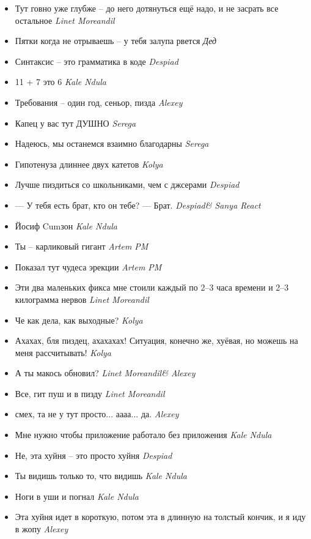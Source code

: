 \documentclass[11pt]{book}
\newcommand{\entry}[2] {\large{\textmd{#1}} \textemdash \small{\emph{#2}}}
\newcommand{\kn}{Kale Ndula}
\newcommand{\lm}{Linet Moreandil}
\newcommand{\dd}{Despiad}
\newcommand{\al}{Alexey}
\newcommand{\se}{Serega}
\newcommand{\nb}{Kolya}
\begin{document}
\begin{itemize}[leftmargin=0cm]
\item \entry{Тут говно уже глубже -- до него дотянуться ещё надо, и не засрать все остальное}{\lm}
\item \entry{Пятки когда не отрываешь -- у тебя залупа рвется}{Дед}
\item \entry{Синтаксис -- это грамматика в коде}{\dd}
\item \entry{11 + 7 это 6}{\kn}
\item \entry{Требования -- один год, сеньор, пизда}{\al}
\item \entry{Капец у вас тут ДУШНО}{\se}
\item \entry{Надеюсь, мы останемся взаимно благодарны}{\se}
\item \entry{Гипотенуза длиннее двух катетов}{\nb}
\item \entry{Лучше пиздиться со школьниками, чем с джсерами}{\dd}
\item \entry{--- У тебя есть брат, кто он тебе? --- Брат.}{\dd \& Sanya React}
\item \entry{Йосиф Cumзон}{\kn}
\item \entry{Ты -- карликовый гигант}{Artem PM}
\item \entry{Показал тут чудеса эрекции}{Artem PM}
\item \entry{Эти два маленьких фикса мне стоили каждый по 2--3 часа времени и 2--3 килограмма нервов}{\lm}
\item \entry{Че как дела, как выходные?}{\nb}
\item \entry{Ахахах, бля пиздец, ахахахах! Ситуация, конечно же, хуёвая, но можешь на меня рассчитывать!}{\nb}
\item \entry{А ты макось обновил?}{\lm \& \al}
\item \entry{Все, гит пуш и в пизду}{\lm}
\item \entry{\*смех\*, та не у тут просто... аааа... да.}{\al}
\item \entry{Мне нужно чтобы приложение работало без приложения}{\kn}
\item \entry{Не, эта хуйня -- это просто хуйня}{\dd}
\item \entry{Ты видишь только то, что видишь}{\kn}
\item \entry{Ноги в уши и погнал}{\kn}
\item \entry{Эта хуйня идет в короткую, потом эта в длинную на толстый кончик, и я иду в жопу}{\al}

\end{itemize}
\end{document}
